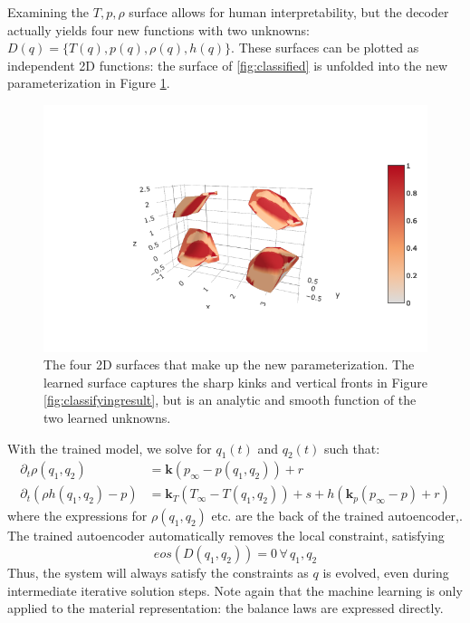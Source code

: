 \documentclass[]{article}
\begin{document}
Examining the $T,p,\rho$ surface allows for human interpretability, but
the decoder actually yields four new functions with two unknowns:
$D(q)=\{T(q),p(q),\rho(q),h(q)\}$. These surfaces can be plotted as
independent 2D functions: the surface of \ref{fig:classified} is
unfolded into the new parameterization in Figure \ref{fig:foursurfaces}.
\begin{figure}
  \centering
  \includegraphics{../slides/water_four_surfaces_plot.png}
  \caption{\label{fig:foursurfaces}The four 2D surfaces that make up
    the new parameterization. The learned surface captures the sharp
    kinks and vertical fronts in Figure \ref{fig:classifyingresult},
    but is an analytic and smooth function of the two learned unknowns.}
  \end{figure}

With the trained model, we solve for \(q_1(t)\) and \(q_2(t)\) such that:
\begin{align}
\partial_t \rho(q_1,q_2) & = \mathbf{k} \left( p_\infty-p(q_1,q_2) \right)  + r \\
\partial_t \left(\rho h(q_1,q_2)-p\right) & =\mathbf{k}_T(T_\infty-T(q_1,q_2))  + s + h\left(\mathbf{k}_p(p_\infty - p) + r\right)
\end{align}
where the expressions for  \(\rho(q_1,q_2)\) etc. are the back of the
trained autoencoder,. The trained
autoencoder automatically removes the local constraint, satisfying
\begin{equation}
eos(D(q_1,q_2)) = 0 \, \forall \,q_1,q_2
\end{equation}
Thus, the system will always satisfy the constraints as $q$ is
evolved, even during intermediate iterative solution steps. Note again
that the machine learning is only applied to the
material representation: the balance laws are expressed directly.
\end{document}
